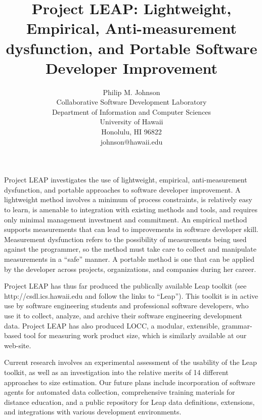 
\setlength{\textheight}{9.45in}
\setlength{\oddsidemargin}{-0.5in}
\setlength{\evensidemargin}{-0.5in}
\setlength{\topmargin}{-0.49in}
\setlength{\footskip}{0.5in}
\def \columnsep{0.2in}
\def \textwidth{7.45in}

\title{\vspace{-0.75in} Project LEAP:
     Lightweight, Empirical, Anti-measurement dysfunction, and Portable
     Software Developer Improvement}

\author{Philip M. Johnson \\
Collaborative Software Development Laboratory \\
Department of Information and Computer Sciences \\
University of Hawaii \\
Honolulu, HI 96822 \\
johnson@hawaii.edu \\
}



\date{}

\maketitle

Project LEAP investigates the use of lightweight, empirical,
anti-measurement dysfunction, and portable approaches to software developer
improvement. A lightweight method involves a minimum of process
constraints, is relatively easy to learn, is amenable to integration with
existing methods and tools, and requires only minimal management investment
and commitment.  An empirical method supports measurements that can lead to
improvements in software developer skill.  Measurement dysfunction
refers to the possibility of measurements being used against the
programmer, so the method must take care to collect and manipulate
measurements in a ``safe'' manner. A portable method is one that can be
applied by the developer across projects, organizations, and companies
during her career.

Project LEAP has thus far produced the publically available Leap toolkit
(see http://csdl.ics.hawaii.edu and follow the links to ``Leap'').  This
toolkit is in active use by software engineering students and professional
software developers, who use it to collect, analyze, and archive their
software engineering development data.  Project LEAP has also produced
LOCC, a modular, extensible, grammar-based tool for measuring work product
size, which is similarly available at our web-site. 

Current research involves an experimental assessment of the usability of 
the Leap toolkit, as well as an investigation into the relative merits
of 14 different approaches to size estimation.  Our future plans include
incorporation of software agents for automated data collection, 
comprehensive training materials for distance education, and a public
repository for Leap data definitions, extensions, and integrations with
various development environments. 




